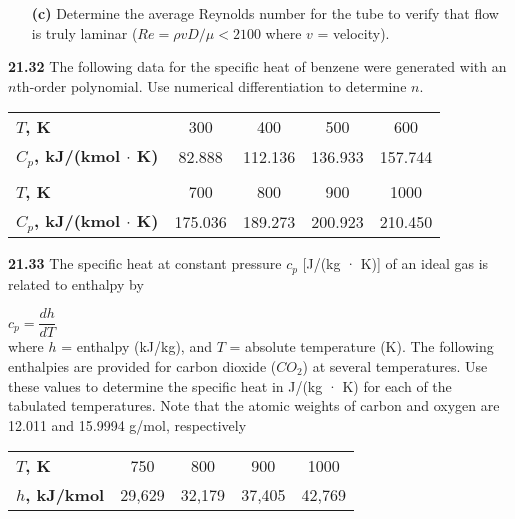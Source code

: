 \documentclass[../main.tex]{subfiles}
\begin{document}
\begin{multicols}{2}
\begin{enumerate}
	\item[\textbf{(c)}] Determine the average Reynolds number for the tube to
verify that flow is truly laminar ($Re = \rho vD/\mu < 2100$
where $v$ = velocity).
\end{enumerate}


\textbf{21.32} The following data for the specific heat of benzene
were generated with an $n$th-order polynomial. Use numerical differentiation to determine $n$.\\
\begin{tabular}{lcccc}
	\hline

	\tiny{\textbf{$T$, K}} & \tiny{300} & \tiny{400} & \tiny{500} & \tiny{600}\\
	
	\tiny{\textbf{$C_{p}$, kJ/(kmol $\cdot$ K)}} &  \tiny{82.888} & \tiny{112.136} & \tiny{136.933} & \tiny{157.744}\\
	
	\vspace{0,1in}\\
	
	\tiny{\textbf{$T$, K}} & \tiny{700} & \tiny{800} & \tiny{900} & \tiny{1000}\\
	
	\tiny{\textbf{$C_{p}$, kJ/(kmol $\cdot$ K)}} & \tiny{175.036} & \tiny{189.273} & \tiny{200.923} & \tiny{210.450}\\

	\hline
\end{tabular}

\textbf{21.33} The specific heat at constant pressure $c_{p}$ [J/(kg · K)]
of an ideal gas is related to enthalpy by

  $ c_{p} = \dfrac{dh}{dT} $\\
where $h$ = enthalpy (kJ/kg), and $T$ = absolute temperature (K). The following enthalpies are provided for carbon dioxide ($CO_{2}$) at several temperatures. Use these values to
determine the specific heat in J/(kg · K) for each of the tabulated temperatures. Note that the atomic weights of carbon
and oxygen are 12.011 and 15.9994 g/mol, respectively\\
\begin{tabular}{lcccc}
	\hline

	\textbf{$T$, K} & 750 & 800 & 900 & 1000\\
	
	\textbf{$h$, kJ/kmol} & 29,629 & 32,179 & 37,405 & 42,769\\

	\hline
\end{tabular}



\end{multicols}
\end{document}
